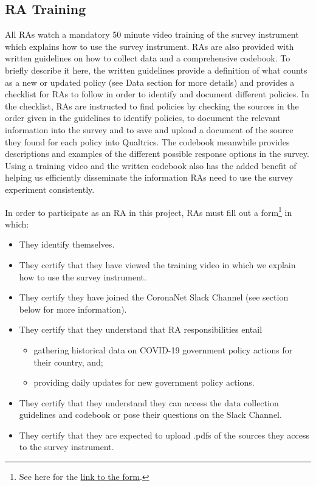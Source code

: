 \documentclass[]{article}
\providecommand{\tightlist}{%
  \setlength{\itemsep}{0pt}\setlength{\parskip}{0pt}}
\let\rmarkdownfootnote\footnote%
\def\footnote{\protect\rmarkdownfootnote}
\begin{document}
\hypertarget{ra-training}{%
\subsection{RA Training}\label{ra-training}}

All RAs watch a mandatory 50 minute video training of the survey instrument which explains how to use the survey instrument. RAs are also provided with written guidelines on how to collect data and a comprehensive codebook. To briefly describe it here, the written guidelines provide a definition of what counts as a new or updated policy (see Data section for more details) and provides a checklist for RAs to follow in order to identify and document different policies. In the checklist, RAs are instructed to find policies by checking the sources in the order given in the guidelines to identify policies, to document the relevant information into the survey and to save and upload a document of the source they found for each policy into Qualtrics. The codebook meanwhile provides descriptions and examples of the different possible response options in the survey. Using a training video and the written codebook also has the added benefit of helping us efficiently disseminate the information RAs need to use the survey experiment consistently.

In order to participate as an RA in this project, RAs must fill out a form\footnote{See here for the \href{https://docs.google.com/forms/d/e/1FAIpQLSeybAW0DC0UE1x2EqLiTifVFuSUxqJLGFB8VI4wVCG61tVYKg/viewform}{link to the form}.} in which:

\begin{itemize}
\tightlist
\item
  They identify themselves.
\item
  They certify that they have viewed the training video in which we explain how to use the survey instrument.
\item
  They certify they have joined the CoronaNet Slack Channel (see section below for more information).
\item
  They certify that they understand that RA responsibilities entail

  \begin{itemize}
  \tightlist
  \item
    gathering historical data on COVID-19 government policy actions for their country, and;
  \item
    providing daily updates for new government policy actions.
  \end{itemize}
\item
  They certify that they understand they can access the data collection guidelines and codebook or pose their questions on the Slack Channel.
\item
  They certify that they are expected to upload .pdfs of the sources they access to the survey instrument.
\end{itemize}
\end{document}
